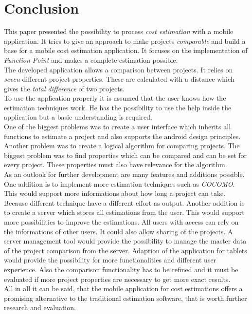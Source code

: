 \chapter{Conclusion}

This paper presented the possibility to process \textit{cost estimation} with a mobile application. It tries to give an approach to make projects \textit{comparable} and build a base for a mobile cost estimation application. It focuses on the implementation of \textit{Function Point} and makes a complete estimation possible.\\
The developed application allows a comparison between projects. It relies on \textit{seven} different project properties. These are calculated with a distance which gives the \textit{total difference} of two projects. \\
To use the application properly it is assumed that the user knows how the estimation techniques work. He has the possibility to use the help inside the application but a basic understanding is required.\\
One of the biggest problems was to create a user interface which inherits all functions to estimate a project and also supports the android design principles.\\
Another problem was to create a logical algorithm for comparing projects. The biggest problem was to find properties which can be compared and can be set for every project. These properties must also have relevance for the algorithm.\\
As an outlook for further development are many features and additions possible. One addition is to implement more estimation techniques such as \textit{COCOMO}. This would support more informations about how long a project can take. Because different technique have a different effort as output. Another addition is to create a server which stores all estimations from the user. This would support more possibilities to improve the estimations. All users with access can rely on the informations of other users. It could also allow sharing of the projects. A server management tool would provide the possibility to manage the master data of the project comparison from the server. Adaption of the application for tablets would provide the possibility for more functionalities and different user experience. Also the comparison functionality has to be refined and it must be evaluated if more project properties are necessary to get more exact results.\\
All in all it can be said, that the mobile application for cost estimations offers a promising alternative to the traditional estimation software, that is worth further research and evaluation.
